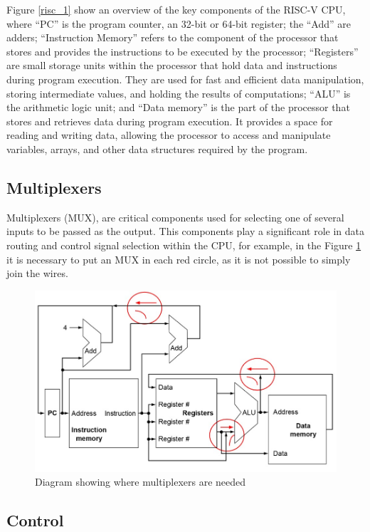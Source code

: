         Figure \ref{risc_1} show an overview of the key components of the RISC-V CPU, where ``PC'' is the program counter, an 32-bit or 64-bit register; the ``Add'' are adders; ``Instruction Memory'' refers to the component of the processor that stores and provides the instructions to be executed by the processor; ``Registers'' are small storage units within the processor that hold data and instructions during program execution. They are used for fast and efficient data manipulation, storing intermediate values, and holding the results of computations; ``ALU'' is the arithmetic logic unit; and ``Data memory'' is the part of the processor that stores and retrieves data during program execution. It provides a space for reading and writing data, allowing the processor to access and manipulate variables, arrays, and other data structures required by the program. 
        
        
        \subsection{Multiplexers}
        
        Multiplexers (MUX), are critical components used for selecting one of several inputs to be passed as the output. This components play a significant role in data routing and control signal selection within the CPU, for example, in the Figure \ref{risc_1a} it is necessary to put an MUX in each red circle, as it is not possible to simply join the wires.
        
                \begin{figure}[!t]
        	    \centering
        	    \includegraphics[width= 0.7
        	    \textwidth]{figures/riscv/risc_1a.jpg}
                    \caption{\label{risc_1a} Diagram showing where multiplexers are needed}
                \end{figure}
        
        \subsection{Control}
        
